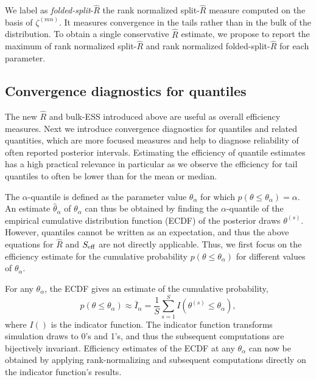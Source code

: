 \documentclass[american,]{article}
\begin{document}
We label as \emph{folded-split}-\(\widehat{R}\) the rank normalized split-\(\widehat{R}\) measure computed on the
basis of \(\zeta^{(mn)}\). It measures convergence in the
tails rather than in the bulk of the distribution. To obtain a single
conservative \(\widehat{R}\) estimate, we propose to report the maximum
of rank normalized split-\(\widehat{R}\) and rank normalized
folded-split-\(\widehat{R}\) for each parameter.

\hypertarget{convergence-diagnostics-for-quantiles}{%
\subsection{Convergence diagnostics for
quantiles}\label{convergence-diagnostics-for-quantiles}}

The new \(\widehat{R}\) and bulk-ESS introduced above are useful as overall efficiency
measures. Next we introduce
convergence diagnostics for quantiles and related quantities, which are more focused measures and help to diagnose reliability of often reported
posterior intervals. Estimating
the efficiency of quantile estimates has a high practical
relevance in particular as we observe the efficiency for tail quantiles
to often be lower than for the mean or median.

The \(\alpha\)-quantile
is defined as the parameter value \(\theta_\alpha\) for which
\(p(\theta \leq \theta_\alpha) = \alpha\). An estimate
\(\hat{\theta}_\alpha\) of \(\theta_\alpha\) can thus be obtained by
finding the \(\alpha\)-quantile of the empirical cumulative distribution function (ECDF) of the
posterior draws \(\theta^{(s)}\). However, quantiles cannot be written
as an expectation, and thus the above equations for \(\widehat{R}\) and
\(S_{\rm eff}\) are not directly applicable. Thus, we first focus on the
efficiency estimate for the cumulative probability
\(p(\theta \leq \theta_\alpha)\) for different values of
\(\theta_\alpha\).

For any \(\theta_\alpha\), the ECDF gives an estimate of the cumulative
probability,
\begin{equation}
p(\theta \leq \theta_\alpha) \approx \bar{I}_\alpha = \frac{1}{S}\sum_{s=1}^S
I(\theta^{(s)} \leq\theta_\alpha),
\end{equation}
where \(I()\) is the indicator function. The indicator function
transforms simulation draws to 0's and 1's, and thus the subsequent
computations are bijectively invariant. Efficiency estimates of the ECDF
at any \(\theta_\alpha\) can now be obtained by applying
rank-normalizing and subsequent computations directly on the indicator
function's results.
\end{document}
